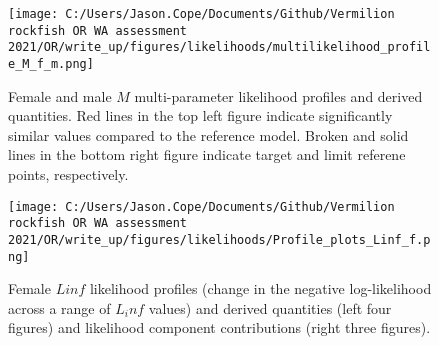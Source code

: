 \documentclass[11pt,
  english,
  a4paper,
]{article}
\begin{document}
\tagmcend\tagstructend


\begin{figure}
\centering
\texttt{[image: C:/Users/Jason.Cope/Documents/Github/Vermilion rockfish OR WA assessment 2021/OR/write\_up/figures/likelihoods/multilikelihood\_profile\_M\_f\_m.png]}
\caption{Female and male {\(M\)\leavevmode\tagmcend\tagstructend} multi-parameter likelihood profiles and derived quantities. Red lines in the top left figure indicate significantly similar values compared to the reference model. Broken and solid lines in the bottom right figure indicate target and limit referene points, respectively.\label{fig:M-multiprofile-combo}}
\end{figure}

\tagmcend\tagstructend


\begin{figure}
\centering
\texttt{[image: C:/Users/Jason.Cope/Documents/Github/Vermilion rockfish OR WA assessment 2021/OR/write\_up/figures/likelihoods/Profile\_plots\_Linf\_f.png]}
\caption{Female {\(Linf\)\leavevmode\tagmcend\tagstructend} likelihood profiles (change in the negative log-likelihood across a range of {\(L_inf\)\leavevmode\tagmcend\tagstructend} values) and derived quantities (left four figures) and likelihood component contributions (right three figures).\label{fig:Linf_F-profile-combo}}
\end{figure}

\tagmcend\tagstructend

\end{document}
